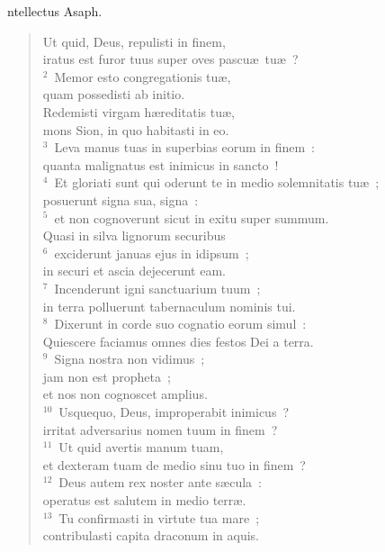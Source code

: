 \bchapter
{}ntellectus Asaph. \begin{flushleft}\begin{verse}\vspace{6pt}Ut quid, Deus, repulisti in finem,\\ iratus est furor tuus super oves pascu\ae\ tu\ae~?\\
${}^{2}$~Memor esto congregationis tu\ae ,\\ quam possedisti ab initio.\\ Redemisti virgam h\ae reditatis tu\ae ,\\ mons Sion, in quo habitasti in eo.\\
${}^{3}$~Leva manus tuas in superbias eorum in finem~:\\ quanta malignatus est inimicus in sancto~!\\
${}^{4}$~Et gloriati sunt qui oderunt te in medio solemnitatis tu\ae~;\\ posuerunt signa sua, signa~:\\
${}^{5}$~et non cognoverunt sicut in exitu super summum.\\ Quasi in silva lignorum securibus\\
${}^{6}$~exciderunt januas ejus in idipsum~;\\ in securi et ascia dejecerunt eam.\\
${}^{7}$~Incenderunt igni sanctuarium tuum~;\\ in terra polluerunt tabernaculum nominis tui.\\
${}^{8}$~Dixerunt in corde suo cognatio eorum simul~:\\ Quiescere faciamus omnes dies festos Dei a terra.\\
${}^{9}$~Signa nostra non vidimus~;\\ jam non est propheta~;\\ et nos non cognoscet amplius.\\
${}^{10}$~Usquequo, Deus, improperabit inimicus~?\\ irritat adversarius nomen tuum in finem~?\\
${}^{11}$~Ut quid avertis manum tuam,\\ et dexteram tuam de medio sinu tuo in finem~?\\
${}^{12}$~Deus autem rex noster ante s\ae cula~:\\ operatus est salutem in medio terr\ae .\\
${}^{13}$~Tu confirmasti in virtute tua mare~;\\ contribulasti capita draconum in aquis.\\

\end{verse}
\end{flushleft}
